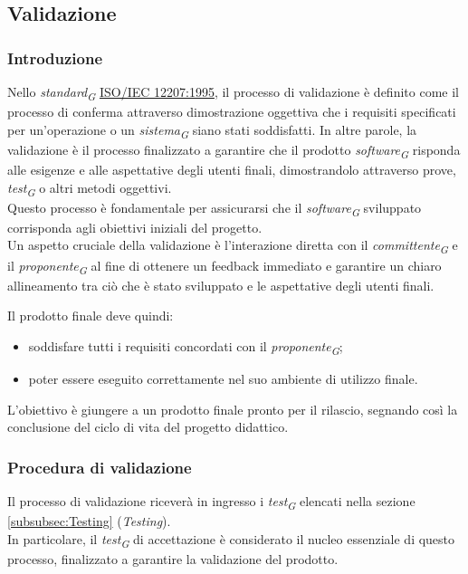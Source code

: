 \subsection{Validazione}
\label{subsec:validazione}

\subsubsection{Introduzione}
Nello \textit{standard}\textsubscript{\textit{G}} \href{https://www.math.unipd.it/~tullio/IS-1/2009/Approfondimenti/ISO_12207-1995.pdf}{ISO/IEC 12207:1995}, il processo di validazione è definito come il processo di conferma attraverso dimostrazione oggettiva che i requisiti specificati per un'operazione o un \textit{sistema}\textsubscript{\textit{G}} siano stati soddisfatti. In altre parole, la validazione è il processo finalizzato a garantire che il prodotto \textit{software}\textsubscript{\textit{G}} risponda alle esigenze e alle aspettative degli utenti finali, dimostrandolo attraverso prove, \textit{test}\textsubscript{\textit{G}} o altri metodi oggettivi. \\
Questo processo è fondamentale per assicurarsi che il \textit{software}\textsubscript{\textit{G}} sviluppato corrisponda agli obiettivi iniziali del progetto. \\
Un aspetto cruciale della validazione è l'interazione diretta con il \textit{committente}\textsubscript{\textit{G}} e il \textit{proponente}\textsubscript{\textit{G}} al fine di ottenere un feedback immediato e garantire un chiaro allineamento tra ciò che è stato sviluppato e le aspettative degli utenti finali.

Il prodotto finale deve quindi: 
\begin{itemize}
    \item 
        soddisfare tutti i requisiti concordati con il \textit{proponente}\textsubscript{\textit{G}}; 
    \item 
        poter essere eseguito correttamente nel suo ambiente di utilizzo finale.
\end{itemize}

L'obiettivo è giungere a un prodotto finale pronto per il rilascio, segnando così la conclusione del ciclo di vita del progetto didattico. 

\subsubsection{Procedura di validazione}
Il processo di validazione riceverà in ingresso i \textit{test}\textsubscript{\textit{G}} elencati nella sezione \ref{subsubsec:Testing} (\textit{Testing}). \\
In particolare, il \textit{test}\textsubscript{\textit{G}} di accettazione è considerato il nucleo essenziale di questo processo, finalizzato a garantire la validazione del prodotto.

